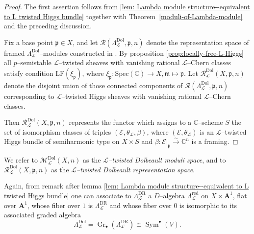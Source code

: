 \documentclass[12pt,reqno]{amsart}
\numberwithin{equation}{subsection}
\theoremstyle{definition}
\theoremstyle{theorem}
\begin{document}
\begin{proof}
	The first assertion follows from
	\eqref{lem: Lambda module structure--equivalent to L twisted Higgs bundle} together with Theorem~\eqref{moduli-of-Lambda-module} and the preceding discussion.
	
	Fix a base point $\mathfrak{p} \in X$, and let
	$\mathcal{R}(\Lambda^{\text{Dol}}_{\mathcal{L}},\mathfrak{p},n)$ denote the representation space
	of framed $\Lambda^{\mathrm{Dol}}_{\mathcal{L}}$--modules constructed in
	\cite[\S\,4, Theorem~4.10]{CT.Simpson-1994}. By proposition \eqref{prop:locally-free-L-Higgs} all $p$--semistable $\mathcal{L}$--twisted sheaves with vanishing rational $\mathcal{L}$--Chern classes satisfy condition $\text{LF}(\xi_{\mathfrak{p}})$, where $\xi_{\mathfrak{p}}:\text{Spec}(\mathbb{C})\rightarrow X, \mathfrak{m}\mapsto \mathfrak{p}$. Let
	$\mathcal{R}^{\mathrm{Dol}}_{\mathcal{L}}(X,\mathfrak{p},n)$ denote the disjoint union of those connected components of
	$\mathcal{R}(\Lambda^{\text{Dol}}_{\mathcal{L}},\mathfrak{p},n)$ corresponding to
	$\mathcal{L}$--twisted Higgs sheaves with vanishing rational
	$\mathcal{L}$--Chern classes.
	
	Then $\mathcal{R}^{\mathrm{Dol}}_{\mathcal{L}}(X,\mathfrak{p},n)$ represents the functor which assigns to a $\mathbb{C}$--scheme $S$ the set of isomorphism classes of triples $(\mathcal{E},\theta_{\mathcal{L}},\beta)$, where
	$(\mathcal{E},\theta_{\mathcal{L}})$ is an $\mathcal{L}$--twisted Higgs bundle of semiharmonic type on $X \times S$ and
	$\beta \colon \mathcal{E}|_{\mathfrak{p}} \xrightarrow{\sim} \mathbb{C}^{n}$ is a framing.
	
	
\end{proof}

We refer to $\mathcal{M}^{\mathrm{Dol}}_{\mathcal{L}}(X,n)$ as the
\emph{$\mathcal{L}$--twisted Dolbeault moduli space}, and to
$\mathcal{R}^{\mathrm{Dol}}_{\mathcal{L}}(X,\mathfrak{p},n)$ as the
\emph{$\mathcal{L}$--twisted Dolbeault representation space}.


Again, from remark after lemma \eqref{lem: Lambda module structure--equivalent to L twisted Higgs bundle} one can associate to $\Lambda^{\text{DR}}_{\mathcal{L}}$ a $D$--algebra
$\Lambda_{\mathcal{L}}^{\mathrm{red}}$ on $X \times \mathbf{A}^{1}$,
flat over $\mathbf{A}^{1}$, whose fiber over $1$ is $\Lambda^{\text{DR}}_{\mathcal{L}}$
and whose fiber over $0$ is isomorphic to its associated graded algebra
\[
\Lambda^{\mathrm{Dol}}_{\mathcal{L}}
= \operatorname{Gr}_{\bullet}(\Lambda^{\text{DR}}_{\mathcal{L}})
\cong \operatorname{Sym}^{\bullet}(V).
\]
\end{document}
